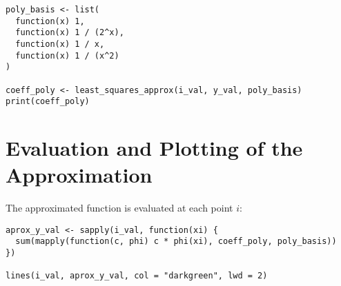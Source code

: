 \documentclass[a4paper,12pt]{article}
\begin{document}
\begin{lstlisting}[caption=Define basis functions and compute coefficients]
poly_basis <- list(
  function(x) 1,
  function(x) 1 / (2^x),
  function(x) 1 / x,
  function(x) 1 / (x^2)
)

coeff_poly <- least_squares_approx(i_val, y_val, poly_basis)
print(coeff_poly)
\end{lstlisting}



\section{Evaluation and Plotting of the Approximation}
The approximated function is evaluated at each point $i$:

\begin{lstlisting}[caption=Evaluate and plot the approximation]
aprox_y_val <- sapply(i_val, function(xi) {
  sum(mapply(function(c, phi) c * phi(xi), coeff_poly, poly_basis))
})

lines(i_val, aprox_y_val, col = "darkgreen", lwd = 2)
\end{lstlisting}
\end{document}
